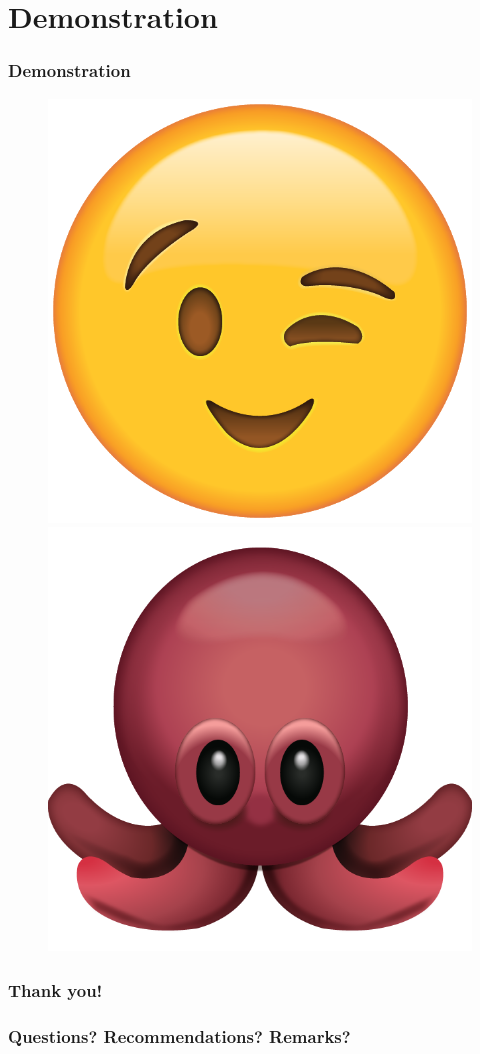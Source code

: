 \documentclass{beamer}
\begin{document}
\section{Demonstration}
\begin{frame}
\frametitle{Demonstration}
\begin{figure}
\centering
\includegraphics[scale=0.1]{img/wink.png}
\includegraphics[scale=0.1]{img/oct_emoji.png}
\end{figure}
\end{frame}

\begin{frame}
\frametitle{Thank you!}
\end{frame}

\begin{frame}
 \frametitle{Questions? Recommendations? Remarks?}
\end{frame}
\end{document}
